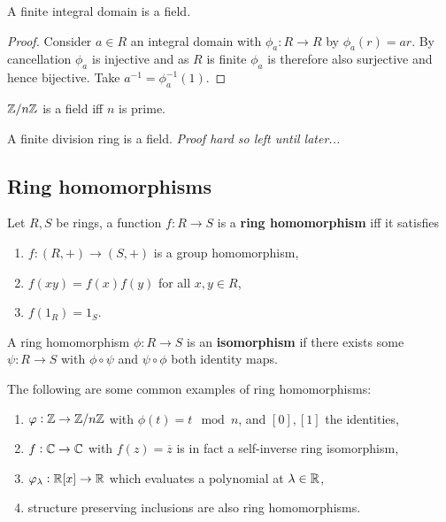 \documentclass{report}
\begin{document}
\begin{lemma}
    A finite integral domain is a field. \begin{proof}
        Consider $a\in R$ an integral domain with $\phi_a:R\rightarrow R$ by $\phi_a(r)=ar$. By cancellation $\phi_a$ is injective and as $R$ is finite $\phi_a$ is therefore also surjective and hence bijective. Take $a^{-1}=\phi_a^{-1}(1)$.
    \end{proof}
\end{lemma}

\begin{corollary}
    $\mathbb{Z}/n\mathbb{Z}$ is a field iff $n$ is prime.
\end{corollary}

\begin{theorem}[Wedderburn]
    A finite division ring is a field. \textit{Proof hard so left until later...}
\end{theorem}

\subsection{Ring homomorphisms}

\begin{definition}
    Let $R,S$ be rings, a function $f:R\rightarrow S$ is a \textbf{ring homomorphism} iff it satisfies \begin{enumerate}
        \item $f:(R,+)\rightarrow (S,+)$ is a group homomorphism,
        \item $f(xy)=f(x)f(y)$ for all $x,y\in R$,
        \item $f(1_R)=1_S$.
    \end{enumerate}
    A ring homomorphism $\phi:R\rightarrow S$ is an \textbf{isomorphism} if there exists some $\psi:R\rightarrow S$ with $\phi\circ\psi$ and $\psi\circ\phi$ both identity maps.
\end{definition}

\begin{examples}
    The following are some common examples of ring homomorphisms: \begin{enumerate}
        \item $\varphi:\mathbb{Z}\rightarrow\mathbb{Z}/n\mathbb{Z}$ with $\phi(t)= t\mod{n}$, and $[0], [1]$ the identities,
        \item $f:\mathbb{C}\rightarrow\mathbb{C}$ with $f(z)=\overline{z}$ is in fact a self-inverse ring isomorphism,
        \item $\varphi_\lambda:\mathbb{R}[x]\rightarrow\mathbb{R}$ which evaluates a polynomial at $\lambda\in\mathbb{R}$,
        \item structure preserving inclusions are also ring homomorphisms.
    \end{enumerate}
\end{examples}
\end{document}
